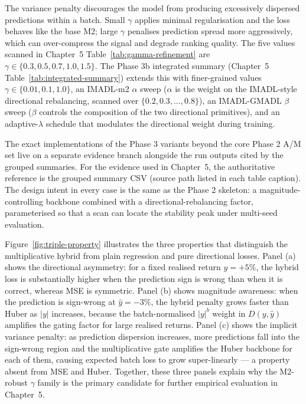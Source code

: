 The variance penalty discourages the model from producing excessively dispersed predictions within a batch. Small $\gamma$ applies minimal regularisation and the loss behaves like the base M2; large $\gamma$ penalises prediction spread more aggressively, which can over-compress the signal and degrade ranking quality. The five values scanned in Chapter~5 Table~\ref{tab:gamma-refinement} are $\gamma \in \{0.3, 0.5, 0.7, 1.0, 1.5\}$. The Phase 3b integrated summary (Chapter~5 Table~\ref{tab:integrated-summary}) extends this with finer-grained values $\gamma \in \{0.01, 0.1, 1.0\}$, an IMADL-m2 $\alpha$ sweep ($\alpha$ is the weight on the IMADL-style directional rebalancing, scanned over $\{0.2, 0.3, \ldots, 0.8\}$), an IMADL-GMADL $\beta$ sweep ($\beta$ controls the composition of the two directional primitives), and an adaptive-$\lambda$ schedule that modulates the directional weight during training.

The exact implementations of the Phase 3 variants beyond the core Phase 2 A/M set live on a separate evidence branch alongside the run outputs cited by the grouped summaries. For the evidence used in Chapter~5, the authoritative reference is the grouped summary CSV (source path listed in each table caption). The design intent in every case is the same as the Phase 2 skeleton: a magnitude-controlling backbone combined with a directional-rebalancing factor, parameterised so that a scan can locate the stability peak under multi-seed evaluation.

Figure~\ref{fig:triple-property} illustrates the three properties that distinguish the multiplicative hybrid from plain regression and pure directional losses. Panel (a) shows the directional asymmetry: for a fixed realised return $y = +5\%$, the hybrid loss is substantially higher when the prediction sign is wrong than when it is correct, whereas MSE is symmetric. Panel (b) shows magnitude awareness: when the prediction is sign-wrong at $\hat y = -3\%$, the hybrid penalty grows faster than Huber as $|y|$ increases, because the batch-normalised $|y|^b$ weight in $D(y, \hat y)$ amplifies the gating factor for large realised returns. Panel (c) shows the implicit variance penalty: as prediction dispersion increases, more predictions fall into the sign-wrong region and the multiplicative gate amplifies the Huber backbone for each of them, causing expected batch loss to grow super-linearly --- a property absent from MSE and Huber. Together, these three panels explain why the M2-robust $\gamma$ family is the primary candidate for further empirical evaluation in Chapter~5.

